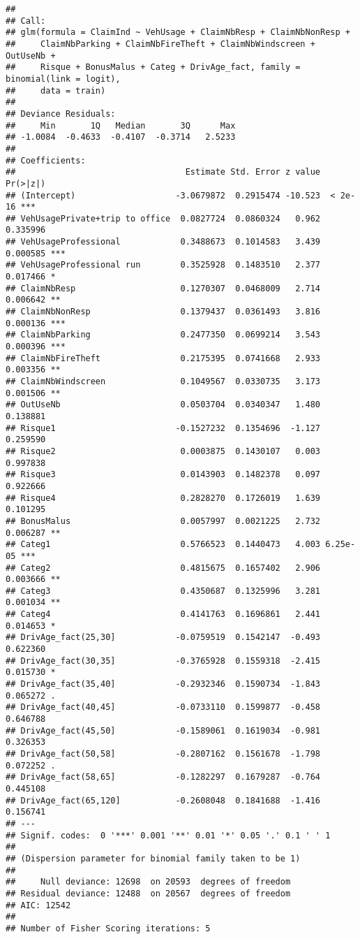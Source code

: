 \documentclass[
]{article}
\begin{document}
\begin{verbatim}
## 
## Call:
## glm(formula = ClaimInd ~ VehUsage + ClaimNbResp + ClaimNbNonResp + 
##     ClaimNbParking + ClaimNbFireTheft + ClaimNbWindscreen + OutUseNb + 
##     Risque + BonusMalus + Categ + DrivAge_fact, family = binomial(link = logit), 
##     data = train)
## 
## Deviance Residuals: 
##     Min       1Q   Median       3Q      Max  
## -1.0084  -0.4633  -0.4107  -0.3714   2.5233  
## 
## Coefficients:
##                                  Estimate Std. Error z value Pr(>|z|)    
## (Intercept)                    -3.0679872  0.2915474 -10.523  < 2e-16 ***
## VehUsagePrivate+trip to office  0.0827724  0.0860324   0.962 0.335996    
## VehUsageProfessional            0.3488673  0.1014583   3.439 0.000585 ***
## VehUsageProfessional run        0.3525928  0.1483510   2.377 0.017466 *  
## ClaimNbResp                     0.1270307  0.0468009   2.714 0.006642 ** 
## ClaimNbNonResp                  0.1379437  0.0361493   3.816 0.000136 ***
## ClaimNbParking                  0.2477350  0.0699214   3.543 0.000396 ***
## ClaimNbFireTheft                0.2175395  0.0741668   2.933 0.003356 ** 
## ClaimNbWindscreen               0.1049567  0.0330735   3.173 0.001506 ** 
## OutUseNb                        0.0503704  0.0340347   1.480 0.138881    
## Risque1                        -0.1527232  0.1354696  -1.127 0.259590    
## Risque2                         0.0003875  0.1430107   0.003 0.997838    
## Risque3                         0.0143903  0.1482378   0.097 0.922666    
## Risque4                         0.2828270  0.1726019   1.639 0.101295    
## BonusMalus                      0.0057997  0.0021225   2.732 0.006287 ** 
## Categ1                          0.5766523  0.1440473   4.003 6.25e-05 ***
## Categ2                          0.4815675  0.1657402   2.906 0.003666 ** 
## Categ3                          0.4350687  0.1325996   3.281 0.001034 ** 
## Categ4                          0.4141763  0.1696861   2.441 0.014653 *  
## DrivAge_fact(25,30]            -0.0759519  0.1542147  -0.493 0.622360    
## DrivAge_fact(30,35]            -0.3765928  0.1559318  -2.415 0.015730 *  
## DrivAge_fact(35,40]            -0.2932346  0.1590734  -1.843 0.065272 .  
## DrivAge_fact(40,45]            -0.0733110  0.1599877  -0.458 0.646788    
## DrivAge_fact(45,50]            -0.1589061  0.1619034  -0.981 0.326353    
## DrivAge_fact(50,58]            -0.2807162  0.1561678  -1.798 0.072252 .  
## DrivAge_fact(58,65]            -0.1282297  0.1679287  -0.764 0.445108    
## DrivAge_fact(65,120]           -0.2608048  0.1841688  -1.416 0.156741    
## ---
## Signif. codes:  0 '***' 0.001 '**' 0.01 '*' 0.05 '.' 0.1 ' ' 1
## 
## (Dispersion parameter for binomial family taken to be 1)
## 
##     Null deviance: 12698  on 20593  degrees of freedom
## Residual deviance: 12488  on 20567  degrees of freedom
## AIC: 12542
## 
## Number of Fisher Scoring iterations: 5
\end{verbatim}
\end{document}
